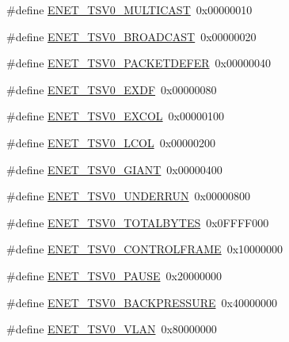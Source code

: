 \begin{DoxyCompactItemize}
\item 
\#define \hyperlink{group___e_n_e_t__17_x_x__40_x_x_ga35811b54e0e0ff6e878184c9bc69c279}{E\+N\+E\+T\+\_\+\+T\+S\+V0\+\_\+\+M\+U\+L\+T\+I\+C\+A\+S\+T}~0x00000010
\item 
\#define \hyperlink{group___e_n_e_t__17_x_x__40_x_x_ga8c81671c6a9577c6bd4cbfca14d0d699}{E\+N\+E\+T\+\_\+\+T\+S\+V0\+\_\+\+B\+R\+O\+A\+D\+C\+A\+S\+T}~0x00000020
\item 
\#define \hyperlink{group___e_n_e_t__17_x_x__40_x_x_gac2d842291755f2488ce8b4ad9d189f6f}{E\+N\+E\+T\+\_\+\+T\+S\+V0\+\_\+\+P\+A\+C\+K\+E\+T\+D\+E\+F\+E\+R}~0x00000040
\item 
\#define \hyperlink{group___e_n_e_t__17_x_x__40_x_x_ga7cb26ea3f926fb8f7950bbbc98eb2d61}{E\+N\+E\+T\+\_\+\+T\+S\+V0\+\_\+\+E\+X\+D\+F}~0x00000080
\item 
\#define \hyperlink{group___e_n_e_t__17_x_x__40_x_x_ga70a4c2d8bcefc36d60b2a006ff3f7496}{E\+N\+E\+T\+\_\+\+T\+S\+V0\+\_\+\+E\+X\+C\+O\+L}~0x00000100
\item 
\#define \hyperlink{group___e_n_e_t__17_x_x__40_x_x_ga51155a3f13ea78c0a858b402212b8b67}{E\+N\+E\+T\+\_\+\+T\+S\+V0\+\_\+\+L\+C\+O\+L}~0x00000200
\item 
\#define \hyperlink{group___e_n_e_t__17_x_x__40_x_x_ga2cc9638b9a72a6aca275ce4aed3701a7}{E\+N\+E\+T\+\_\+\+T\+S\+V0\+\_\+\+G\+I\+A\+N\+T}~0x00000400
\item 
\#define \hyperlink{group___e_n_e_t__17_x_x__40_x_x_ga62faeddfcb2c47a79c79eafd0d53ae70}{E\+N\+E\+T\+\_\+\+T\+S\+V0\+\_\+\+U\+N\+D\+E\+R\+R\+U\+N}~0x00000800
\item 
\#define \hyperlink{group___e_n_e_t__17_x_x__40_x_x_gaced2c895c68a65e25f18810332a9e60c}{E\+N\+E\+T\+\_\+\+T\+S\+V0\+\_\+\+T\+O\+T\+A\+L\+B\+Y\+T\+E\+S}~0x0\+F\+F\+F\+F000
\item 
\#define \hyperlink{group___e_n_e_t__17_x_x__40_x_x_ga2ab4cf2c962a57d2b59cdac5324caf08}{E\+N\+E\+T\+\_\+\+T\+S\+V0\+\_\+\+C\+O\+N\+T\+R\+O\+L\+F\+R\+A\+M\+E}~0x10000000
\item 
\#define \hyperlink{group___e_n_e_t__17_x_x__40_x_x_ga389586db52739a1a88da7059b813cf80}{E\+N\+E\+T\+\_\+\+T\+S\+V0\+\_\+\+P\+A\+U\+S\+E}~0x20000000
\item 
\#define \hyperlink{group___e_n_e_t__17_x_x__40_x_x_ga0a02af6e44148eb10ad3872f558a7d75}{E\+N\+E\+T\+\_\+\+T\+S\+V0\+\_\+\+B\+A\+C\+K\+P\+R\+E\+S\+S\+U\+R\+E}~0x40000000
\item 
\#define \hyperlink{group___e_n_e_t__17_x_x__40_x_x_gacc8396f1c837bf51215f1f29a062bba4}{E\+N\+E\+T\+\_\+\+T\+S\+V0\+\_\+\+V\+L\+A\+N}~0x80000000

\end{DoxyCompactItemize}

